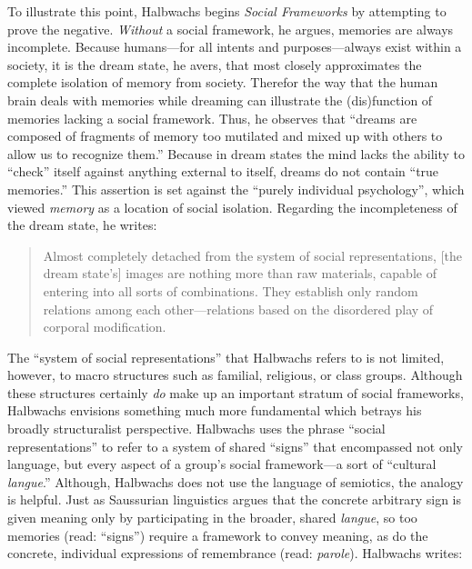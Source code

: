 To illustrate this point, Halbwachs begins \emph{Social Frameworks} by
attempting to prove the negative. \emph{Without} a social framework, he
argues, memories are always incomplete. Because humans---for all intents
and purposes---always exist within a society, it is the dream state, he
avers, that most closely approximates the complete isolation of memory
from society. Therefor the way that the human brain deals with memories
while dreaming can illustrate the (dis)function of memories lacking a
social framework. Thus, he observes that ``dreams are composed of
fragments of memory too mutilated and mixed up with others to allow us
to recognize them.'' Because in dream states the mind lacks the ability
to ``check'' itself against anything external to itself, dreams do not
contain ``true memories.''\autocite[41]{halbwachs1992} This assertion is
set against the ``purely individual psychology'',\autocites[E.g.,
Bergson, and Freud.
See][]{ansellpearson_radstone-schwarz2011}[and][]{terdiman_radstone-schwarz2011}
which viewed \emph{memory} as a location of social isolation. Regarding
the incompleteness of the dream state, he writes:

\begin{quote}
Almost completely detached from the system of social representations,
{[}the dream state's{]} images are nothing more than raw materials,
capable of entering into all sorts of combinations. They establish only
random relations among each other---relations based on the disordered
play of corporal modification.\autocite[42]{halbwachs1992}
\end{quote}

The ``system of social representations'' that Halbwachs refers to is not
limited, however, to macro structures such as familial, religious, or
class groups. Although these structures certainly \emph{do} make up an
important stratum of social frameworks, Halbwachs envisions something
much more fundamental which betrays his broadly structuralist
perspective. Halbwachs uses the phrase ``social representations'' to
refer to a system of shared ``signs'' that encompassed not only
language, but every aspect of a group's social framework---a sort of
``cultural \emph{langue}.'' Although, Halbwachs does not use the
language of semiotics, the analogy is helpful. Just as Saussurian
linguistics argues that the concrete arbitrary sign is given meaning
only by participating in the broader, shared \emph{langue}, so too
memories (read: ``signs'') require a framework to convey meaning, as do
the concrete, individual expressions of remembrance (read:
\emph{parole}). Halbwachs writes:

